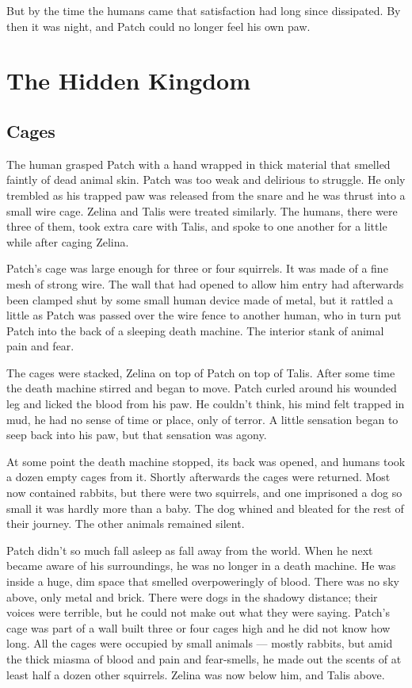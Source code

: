\documentclass[12pt]{book}
\begin{document}
But by the time the humans came that satisfaction had long since dissipated. By then it was night, and Patch could no longer feel his own paw.


\chapter{The Hidden Kingdom}

\section{Cages}

The human grasped Patch with a hand wrapped in thick material that smelled faintly of dead animal skin. Patch was too weak and delirious to struggle. He only trembled as his trapped paw was released from the snare and he was thrust into a small wire cage. Zelina and Talis were treated similarly. The humans, there were three of them, took extra care with Talis, and spoke to one another for a little while after caging Zelina.

Patch's cage was large enough for three or four squirrels. It was made of a fine mesh of strong wire. The wall that had opened to allow him entry had afterwards been clamped shut by some small human device made of metal, but it rattled a little as Patch was passed over the wire fence to another human, who in turn put Patch into the back of a sleeping death machine. The interior stank of animal pain and fear.

The cages were stacked, Zelina on top of Patch on top of Talis. After some time the death machine stirred and began to move. Patch curled around his wounded leg and licked the blood from his paw. He couldn't think, his mind felt trapped in mud, he had no sense of time or place, only of terror. A little sensation began to seep back into his paw, but that sensation was agony.

At some point the death machine stopped, its back was opened, and humans took a dozen empty cages from it. Shortly afterwards the cages were returned. Most now contained rabbits, but there were two squirrels, and one imprisoned a dog so small it was hardly more than a baby. The dog whined and bleated for the rest of their journey. The other animals remained silent.

Patch didn't so much fall asleep as fall away from the world. When he next became aware of his surroundings, he was no longer in a death machine. He was inside a huge, dim space that smelled overpoweringly of blood. There was no sky above, only metal and brick. There were dogs in the shadowy distance; their voices were terrible, but he could not make out what they were saying. Patch's cage was part of a wall built three or four cages high and he did not know how long. All the cages were occupied by small animals ---
mostly rabbits, but amid the thick miasma of blood and pain and fear-smells, he made out the scents of at least half a dozen other squirrels. Zelina was now below him, and Talis above.
\end{document}
